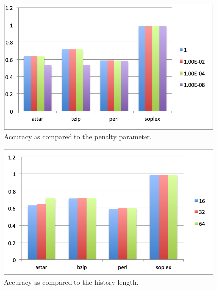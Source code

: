 \documentclass{article}
\begin{document}
\pagebreak

\begin{figure}[t]
  \centering
  \includegraphics[width=.75\textwidth]{penalty-param.png}
  \caption{Accuracy as compared to the penalty parameter.}
\end{figure}

\begin{figure}[t]
  \centering
  \includegraphics[width=.75\textwidth]{history-length.png}
  \caption{Accuracy as compared to the history length.}
\end{figure}

\end{document}
